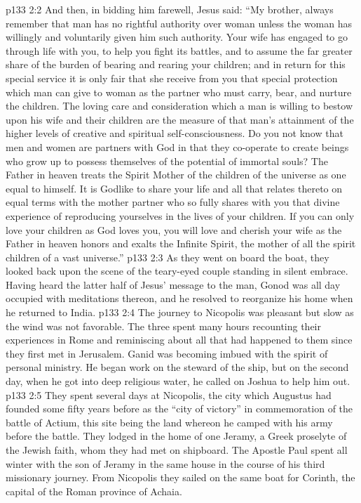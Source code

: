 \vs p133 2:2 And then, in bidding him farewell, Jesus said: \textcolor{ubdarkred}{“My brother, always remember that man has no rightful authority over woman unless the woman has willingly and voluntarily given him such authority. Your wife has engaged to go through life with you, to help you fight its battles, and to assume the far greater share of the burden of bearing and rearing your children; and in return for this special service it is only fair that she receive from you that special protection which man can give to woman as the partner who must carry, bear, and nurture the children. The loving care and consideration which a man is willing to bestow upon his wife and their children are the measure of that man’s attainment of the higher levels of creative and spiritual self\hyp{}consciousness. Do you not know that men and women are partners with God in that they co\hyp{}operate to create beings who grow up to possess themselves of the potential of immortal souls? The Father in heaven treats the Spirit Mother of the children of the universe as one equal to himself. It is Godlike to share your life and all that relates thereto on equal terms with the mother partner who so fully shares with you that divine experience of reproducing yourselves in the lives of your children. If you can only love your children as God loves you, you will love and cherish your wife as the Father in heaven honors and exalts the Infinite Spirit, the mother of all the spirit children of a vast universe.”}
\vs p133 2:3 As they went on board the boat, they looked back upon the scene of the teary\hyp{}eyed couple standing in silent embrace. Having heard the latter half of Jesus’ message to the man, Gonod was all day occupied with meditations thereon, and he resolved to reorganize his home when he returned to India.
\vs p133 2:4 The journey to Nicopolis was pleasant but slow as the wind was not favorable. The three spent many hours recounting their experiences in Rome and reminiscing about all that had happened to them since they first met in Jerusalem. Ganid was becoming imbued with the spirit of personal ministry. He began work on the steward of the ship, but on the second day, when he got into deep religious water, he called on Joshua to help him out.
\vs p133 2:5 They spent several days at Nicopolis, the city which Augustus had founded some fifty years before as the “city of victory” in commemoration of the battle of Actium, this site being the land whereon he camped with his army before the battle. They lodged in the home of one Jeramy, a Greek proselyte of the Jewish faith, whom they had met on shipboard. The Apostle Paul spent all winter with the son of Jeramy in the same house in the course of his third missionary journey. From Nicopolis they sailed on the same boat for Corinth, the capital of the Roman province of Achaia.
